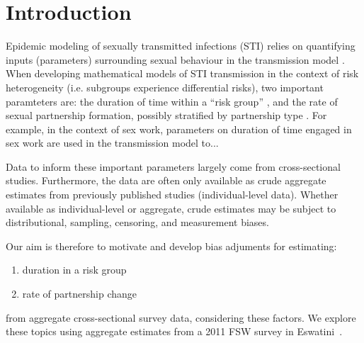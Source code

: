 \section{Introduction} %
Epidemic modeling of sexually transmitted infections (STI) relies on 
quantifying inputs (parameters) surrounding sexual behaviour in the transmission model \cite{Fenton2001}.
When developing mathematical models of STI transmission in the context of risk heterogeneity (i.e.
subgroups experience differential risks),  
two important paramteters are:  %
the duration of time within a ``risk group'' , and
the rate of sexual partnership formation, possibly stratified by partnership type
\cite{Garnett1996,Stigum1997,Henry2015,Knight2020}.
For example, in the context of sex work, parameters on duration of time engaged in sex work 
are used in the transmission model to... %

Data to inform these important parameters largely come from cross-sectional studies. 
Furthermore, the data are often 
only available as crude aggregate estimates
from previously published studies (\vs individual-level data).
Whether available as individual-level or aggregate, crude estimates may be subject to  %
distributional, sampling, censoring, and measurement biases.
\par
Our aim is therefore to motivate and develop bias adjuments for estimating: %
\begin{enumerate}
  \item duration in a risk group
  \item rate of partnership change
\end{enumerate}
from aggregate cross-sectional survey data, considering these factors.  %
We explore these topics using aggregate estimates from
a 2011 FSW survey in Eswatini~\cite{Baral2014}.

